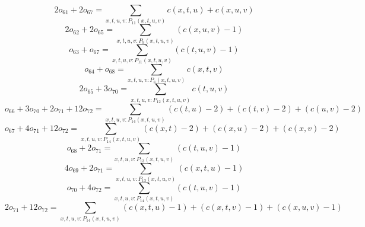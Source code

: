 \[2o_{61} + 2o_{67} = \sum\limits_{x,t,u,v:P_{11} (x,t,u,v)} c( x, t, u ) + c( x, u, v ) \]
\[2o_{62} + 2o_{65} = \sum\limits_{x,t,u,v:P_{9} (x,t,u,v)} ( c( x, u, v ) - 1 ) \]
\[o_{63} + o_{67} = \sum\limits_{x,t,u,v:P_{11} (x,t,u,v)} ( c( t, u, v ) - 1 ) \]
\[o_{64} + o_{68} = \sum\limits_{x,t,u,v:P_{8} (x,t,u,v)} c( x, t, v ) \]
\[2o_{65} + 3o_{70} = \sum\limits_{x,t,u,v:P_{12} (x,t,u,v)} c( t, u, v ) \]
\[o_{66} + 3o_{70} + 2o_{71} + 12o_{72} = \sum\limits_{x,t,u,v:P_{14} (x,t,u,v)} ( c( t, u ) - 2 ) + ( c( t, v ) - 2 ) + ( c( u, v ) - 2 ) \]
\[o_{67} + 4o_{71} + 12o_{72} = \sum\limits_{x,t,u,v:P_{14} (x,t,u,v)} ( c( x, t ) - 2 ) + ( c( x, u ) - 2 ) + ( c( x, v ) - 2 ) \]
\[o_{68} + 2o_{71} = \sum\limits_{x,t,u,v:P_{13} (x,t,u,v)} ( c( t, u, v ) - 1 ) \]
\[4o_{69} + 2o_{71} = \sum\limits_{x,t,u,v:P_{13} (x,t,u,v)} ( c( x, t, u ) - 1 ) \]
\[o_{70} + 4o_{72} = \sum\limits_{x,t,u,v:P_{14} (x,t,u,v)} ( c( t, u, v ) - 1 ) \]
\[2o_{71} + 12o_{72} = \sum\limits_{x,t,u,v:P_{14} (x,t,u,v)} ( c( x, t, u ) - 1 ) + ( c( x, t, v ) - 1 ) + ( c( x, u, v ) - 1 ) \]

